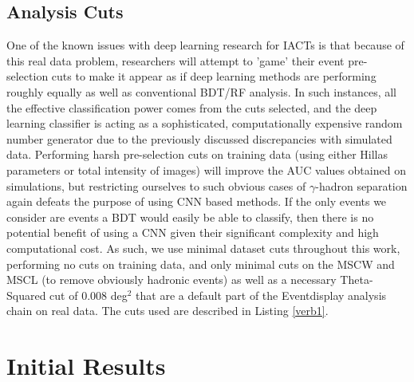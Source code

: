 \subsection{Analysis Cuts}
One of the known issues with deep learning research for IACTs is that because of this real data problem, researchers will attempt to 'game' their event pre-selection cuts to make it appear as if deep learning methods are performing roughly equally as well as conventional BDT/RF analysis. In such instances, all the effective classification power comes from the cuts selected, and the deep learning classifier is acting as a sophisticated, computationally expensive random number generator due to the previously discussed discrepancies with simulated data. Performing harsh pre-selection cuts on training data (using either Hillas parameters or total intensity of images) will improve the AUC values obtained on simulations, but restricting ourselves to such obvious cases of $\gamma$-hadron separation again defeats the purpose of using CNN based methods. If the only events we consider are events a BDT would easily be able to classify, then there is no potential benefit of using a CNN given their significant complexity and high computational cost. As such, we use minimal dataset cuts throughout this work, performing no cuts on training data, and only minimal cuts on the MSCW and MSCL (to remove obviously hadronic events) as well as a necessary Theta-Squared cut of 0.008 deg$^2$ that are a default part of the Eventdisplay analysis chain on real data. The cuts used are described in Listing \ref{verb1}.

\section{Initial Results}

